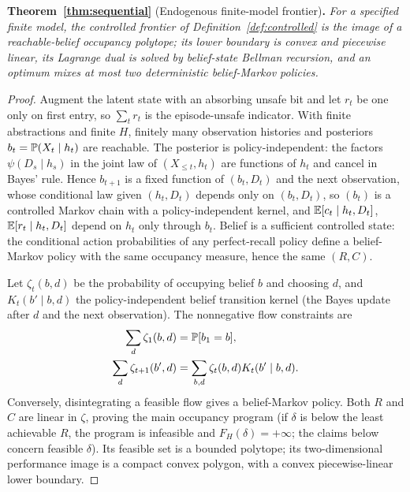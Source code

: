 \medskip
\noindent\textbf{Theorem~\ref{thm:sequential}} (Endogenous finite-model frontier)\textbf{.}
\emph{For a specified finite model, the controlled frontier of
Definition~\ref{def:controlled} is the image of
a reachable-belief occupancy polytope; its lower boundary is convex and
piecewise linear, its Lagrange dual is solved by belief-state Bellman recursion,
and an optimum mixes at most two deterministic belief-Markov policies.}
\begin{proof}
Augment the latent state with an absorbing unsafe bit and let $r_t$ be one only
on first entry, so $\sum_t r_t$ is the episode-unsafe indicator. With finite
abstractions and finite $H$, finitely many observation histories and posteriors
$b_t=\mathbb{P}(X_t\mid h_t)$ are reachable. The posterior is policy-independent: the factors
$\psi(D_s\mid h_s)$ in the joint law of $(X_{\le t},h_t)$ are functions of $h_t$ and cancel in Bayes'
rule. Hence $b_{t+1}$ is a fixed function of $(b_t,D_t)$ and the next observation, whose conditional
law given $(h_t,D_t)$ depends only on $(b_t,D_t)$, so $(b_t)$ is a controlled Markov chain with a
policy-independent kernel, and $\mathbb{E}[c_t\mid h_t,D_t]$, $\mathbb{E}[r_t\mid h_t,D_t]$ depend on $h_t$ only through
$b_t$. Belief is a sufficient controlled state:
the conditional action probabilities of any perfect-recall policy define a
belief-Markov policy with the same occupancy measure, hence the same $(R,C)$.

Let $\zeta_t(b,d)$ be the probability of occupying belief $b$ and choosing $d$, and $K_t(b'\mid b,d)$
the policy-independent belief transition kernel (the Bayes update after $d$ and the next observation).
The nonnegative flow constraints are
\[
\begin{aligned}
\sum_d \zeta_1(b,d)&=\mathbb{P}[b_1=b],\\
\sum_d \zeta_{t+1}(b',d)
  &=\sum_{b,d}\zeta_t(b,d)K_t(b'\mid b,d).
\end{aligned}
\]
Conversely, disintegrating a feasible flow gives a belief-Markov policy. Both
$R$ and $C$ are linear in $\zeta$, proving the main occupancy program (if $\delta$ is below the least
achievable $R$, the program is infeasible and $F_H(\delta)=+\infty$; the claims below concern feasible
$\delta$). Its feasible
set is a bounded polytope; its two-dimensional performance image is a compact
convex polygon, with a convex piecewise-linear lower boundary.


\end{proof}
